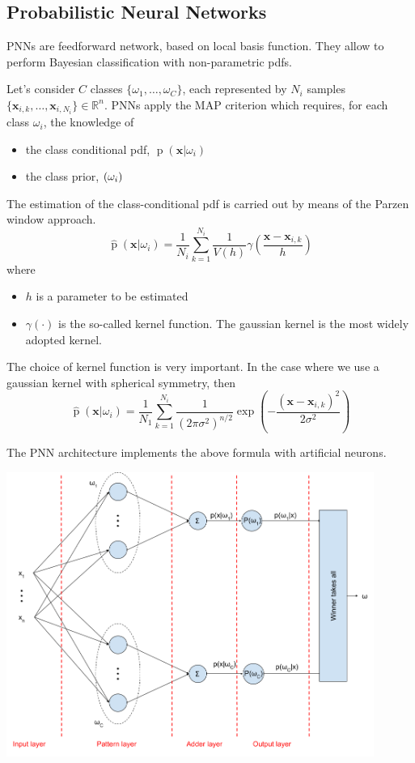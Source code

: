 \documentclass[oneside,onecolumn]{report}
\DeclareMathOperator*{\pdf}{p}
\let\P\relax
\DeclareMathOperator*{\P}{P}
\begin{document}
\subsection{Probabilistic Neural Networks}
PNNs are feedforward network, based on local basis function.
They allow to perform Bayesian classification with non-parametric pdfs.

Let's consider $C$ classes $\{\omega_1, \dots, \omega_C\}$, each represented by $N_i$ samples $\{\bm x_{i,k}, \dots, \bm x_{i,N_i}\} \in \mathbb R^n$.
PNNs apply the MAP criterion which requires, for each class $\omega_i$, the knowledge of
\begin{itemize}
    \item the class conditional pdf, $\pdf(\bm x | \omega_i)$
    \item the class prior, $\P(\omega_i)$
\end{itemize}

The estimation of the class-conditional pdf is carried out by means of the Parzen window approach.
$$ \widehat{\pdf}(\bm x | \omega_i) = \frac{1}{N_i} \sum_{k = 1}^{N_i} \frac{1}{V(h)} \gamma\left( \frac{\bm x - \bm x_{i, k}}{h} \right) $$
where
\begin{itemize}
    \item $h$ is a parameter to be estimated
    \item $\gamma(\cdot)$ is the so-called kernel function.
    The gaussian kernel is the most widely adopted kernel.
\end{itemize}

The choice of kernel function is very important.
In the case where we use a gaussian kernel with spherical symmetry, then
$$ \widehat{\pdf}(\bm x | \omega_i) = \frac{1}{N_1} \sum_{k = 1}^{N_i} \frac{1}{(2 \pi \sigma^2)^{n/2}} \exp(-\frac{(\bm x - \bm x_{i,k})^2}{2 \sigma^2}) $$

The PNN architecture implements the above formula with artificial neurons.
\begin{center}
    \includegraphics[width=12cm]{probabilistic_neural_network.png}
\end{center}
\end{document}
